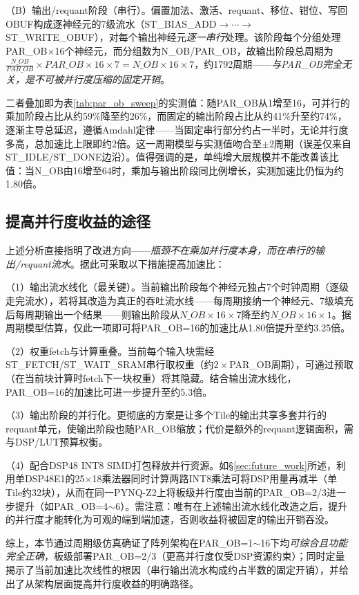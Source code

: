 \documentclass[bachelor,compact,nofont]{xjtuthesis}
\numberwithin{equation}{chapter}
\begin{document}
（B）输出/requant阶段（串行）。偏置加法、激活、requant、移位、钳位、写回OBUF构成逐神经元的7级流水（ST\_BIAS\_ADD$\to\cdots\to$ST\_WRITE\_OBUF），对每个输出神经元\emph{逐一串行}处理。该阶段每个分组处理PAR\_OB$\times$16个神经元，而分组数为N\_OB/PAR\_OB，故输出阶段总周期为$\frac{N\_OB}{PAR\_OB}\times PAR\_OB\times 16\times 7 = N\_OB\times 16\times 7$，约1792周期——\emph{与PAR\_OB完全无关，是不可被并行度压缩的固定开销}。

二者叠加即为表\ref{tab:par_ob_sweep}的实测值：随PAR\_OB从1增至16，可并行的乘加阶段占比从约59\%降至约26\%，而固定的输出阶段占比从约41\%升至约74\%，逐渐主导总延迟，遵循Amdahl定律——当固定串行部分约占一半时，无论并行度多高，总加速比上限即约2倍。这一周期模型与实测值吻合至$\pm$2周期（误差仅来自ST\_IDLE/ST\_DONE边沿）。值得强调的是，单纯增大层规模并不能改善该比值：当N\_OB由16增至64时，乘加与输出阶段同比例增长，实测加速比仍恒为约1.80倍。

\subsection{提高并行度收益的途径}

上述分析直接指明了改进方向——\emph{瓶颈不在乘加并行度本身，而在串行的输出/requant流水}。据此可采取以下措施提高加速比：

（1）输出流水线化（最关键）。当前输出阶段每个神经元独占7个时钟周期（逐级走完流水），若将其改造为真正的吞吐流水线——每周期接纳一个神经元、7级填充后每周期输出一个结果——则输出阶段从$N\_OB\times16\times7$降至约$N\_OB\times16\times1$。据周期模型估算，仅此一项即可将PAR\_OB=16的加速比从1.80倍提升至约3.25倍。

（2）权重fetch与计算重叠。当前每个输入块需经ST\_FETCH/ST\_WAIT\_SRAM串行取权重（约$2\times$PAR\_OB周期），可通过预取（在当前块计算时fetch下一块权重）将其隐藏。结合输出流水线化，PAR\_OB=16的加速比可进一步提升至约5.3倍。

（3）输出阶段的并行化。更彻底的方案是让多个Tile的输出共享多套并行的requant单元，使输出阶段也随PAR\_OB缩放；代价是额外的requant逻辑面积，需与DSP/LUT预算权衡。

（4）配合DSP48 INT8 SIMD打包释放并行资源。如§\ref{sec:future_work}所述，利用单DSP48E1的25$\times$18乘法器同时计算两路INT8乘法可将DSP用量再减半（单Tile约32块），从而在同一PYNQ-Z2上将板级并行度由当前的PAR\_OB=2/3进一步提升（如PAR\_OB=4$\sim$6）。需注意：唯有在上述输出流水线化改造之后，提升的并行度才能转化为可观的端到端加速，否则收益将被固定的输出开销吞没。

综上，本节通过周期级仿真确证了阵列架构在PAR\_OB=1$\sim$16下均\emph{可综合且功能完全正确}，板级部署PAR\_OB=2/3（更高并行度仅受DSP资源约束）；同时定量揭示了当前加速比次线性的根因（串行输出流水构成约占半数的固定开销），并给出了从架构层面提高并行度收益的明确路径。
\end{document}
